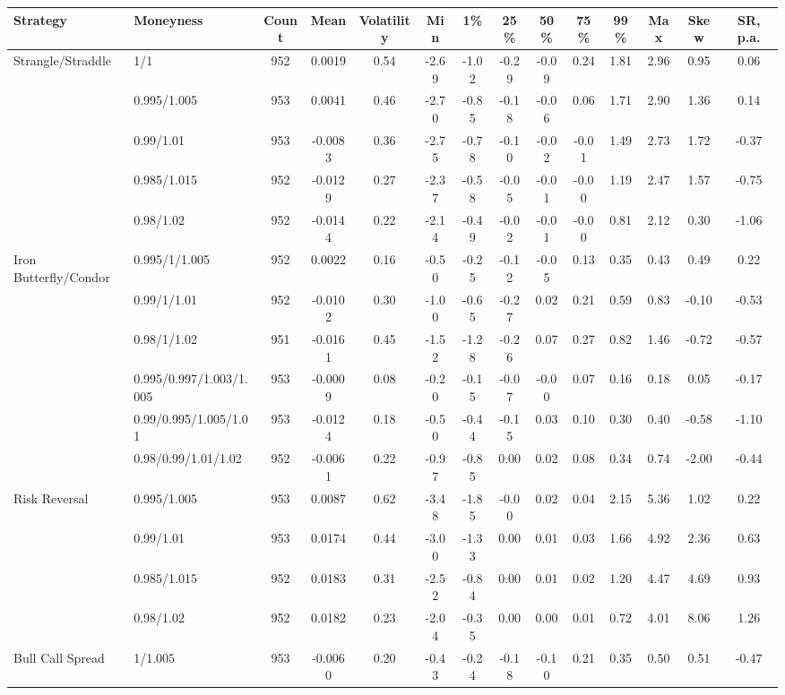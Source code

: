 \begin{tabular}{llcccccccccccc}
\toprule
Strategy & Moneyness & Count & Mean & Volatility & Min & 1\% & 25\% & 50\% & 75\% & 99\% & Max & Skew & SR, p.a. \\
\midrule
Strangle/Straddle & 1/1 & 952 & 0.0019 & 0.54 & -2.69 & -1.02 & -0.29 & -0.09 & 0.24 & 1.81 & 2.96 & 0.95 & 0.06 \\
 & 0.995/1.005 & 953 & 0.0041 & 0.46 & -2.70 & -0.85 & -0.18 & -0.06 & 0.06 & 1.71 & 2.90 & 1.36 & 0.14 \\
 & 0.99/1.01 & 953 & -0.0083 & 0.36 & -2.75 & -0.78 & -0.10 & -0.02 & -0.01 & 1.49 & 2.73 & 1.72 & -0.37 \\
 & 0.985/1.015 & 952 & -0.0129 & 0.27 & -2.37 & -0.58 & -0.05 & -0.01 & -0.00 & 1.19 & 2.47 & 1.57 & -0.75 \\
 & 0.98/1.02 & 952 & -0.0144 & 0.22 & -2.14 & -0.49 & -0.02 & -0.01 & -0.00 & 0.81 & 2.12 & 0.30 & -1.06 \\
Iron Butterfly/Condor & 0.995/1/1.005 & 952 & 0.0022 & 0.16 & -0.50 & -0.25 & -0.12 & -0.05 & 0.13 & 0.35 & 0.43 & 0.49 & 0.22 \\
 & 0.99/1/1.01 & 952 & -0.0102 & 0.30 & -1.00 & -0.65 & -0.27 & 0.02 & 0.21 & 0.59 & 0.83 & -0.10 & -0.53 \\
 & 0.98/1/1.02 & 951 & -0.0161 & 0.45 & -1.52 & -1.28 & -0.26 & 0.07 & 0.27 & 0.82 & 1.46 & -0.72 & -0.57 \\
 & 0.995/0.997/1.003/1.005 & 953 & -0.0009 & 0.08 & -0.20 & -0.15 & -0.07 & -0.00 & 0.07 & 0.16 & 0.18 & 0.05 & -0.17 \\
 & 0.99/0.995/1.005/1.01 & 953 & -0.0124 & 0.18 & -0.50 & -0.44 & -0.15 & 0.03 & 0.10 & 0.30 & 0.40 & -0.58 & -1.10 \\
 & 0.98/0.99/1.01/1.02 & 952 & -0.0061 & 0.22 & -0.97 & -0.85 & 0.00 & 0.02 & 0.08 & 0.34 & 0.74 & -2.00 & -0.44 \\
Risk Reversal & 0.995/1.005 & 953 & 0.0087 & 0.62 & -3.48 & -1.85 & -0.00 & 0.02 & 0.04 & 2.15 & 5.36 & 1.02 & 0.22 \\
 & 0.99/1.01 & 953 & 0.0174 & 0.44 & -3.00 & -1.33 & 0.00 & 0.01 & 0.03 & 1.66 & 4.92 & 2.36 & 0.63 \\
 & 0.985/1.015 & 952 & 0.0183 & 0.31 & -2.52 & -0.84 & 0.00 & 0.01 & 0.02 & 1.20 & 4.47 & 4.69 & 0.93 \\
 & 0.98/1.02 & 952 & 0.0182 & 0.23 & -2.04 & -0.35 & 0.00 & 0.00 & 0.01 & 0.72 & 4.01 & 8.06 & 1.26 \\
Bull Call Spread & 1/1.005 & 953 & -0.0060 & 0.20 & -0.43 & -0.24 & -0.18 & -0.10 & 0.21 & 0.35 & 0.50 & 0.51 & -0.47 \\

\end{tabular}
